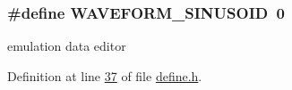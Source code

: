\hypertarget{a00090_aab68961c5134b28289cb1311cac7d500}{
\subsubsection[{W\+A\+V\+E\+F\+O\+R\+M\+\_\+\+S\+I\+N\+U\+S\+O\+I\+D}]{\setlength{\rightskip}{0pt plus 5cm}\#define W\+A\+V\+E\+F\+O\+R\+M\+\_\+\+S\+I\+N\+U\+S\+O\+I\+D~0}}\label{a00090_aab68961c5134b28289cb1311cac7d500}


emulation data editor 



Definition at line \hyperlink{a00090_source_l00037}{37} of file \hyperlink{a00090_source}{define.\+h}.

